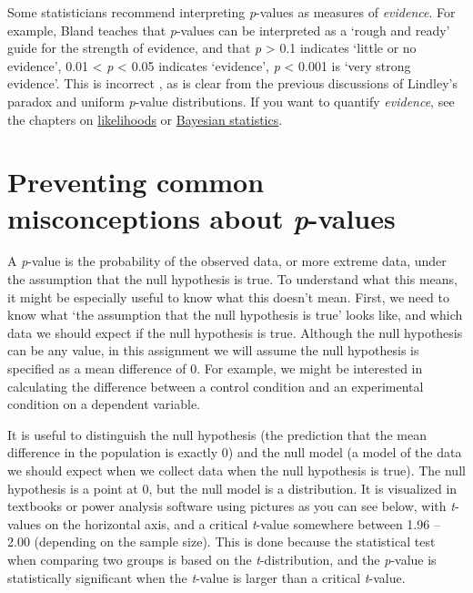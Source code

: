 \documentclass[
  oneside]{book}
\begin{document}
Some statisticians recommend interpreting \emph{p}-values as measures of \emph{evidence}. For example, Bland \citeyearpar{bland_introduction_2015} teaches that \emph{p}-values can be interpreted as a `rough and ready' guide for the strength of evidence, and that \emph{p} \textgreater{} 0.1 indicates `little or no evidence', 0.01 \textless{} \emph{p} \textless{} 0.05 indicates `evidence', \emph{p} \textless{} 0.001 is `very strong evidence'. This is incorrect \citep{lakens_why_2022}, as is clear from the previous discussions of Lindley's paradox and uniform \emph{p}-value distributions. If you want to quantify \emph{evidence}, see the chapters on \protect\hyperlink{likelihoods}{likelihoods} or \protect\hyperlink{bayes}{Bayesian statistics}.

\hypertarget{misconceptions}{%
\section{\texorpdfstring{Preventing common misconceptions about \emph{p}-values}{Preventing common misconceptions about p-values}}\label{misconceptions}}

A \emph{p}-value is the probability of the observed data, or more extreme data, under the assumption that the null hypothesis is true. To understand what this means, it might be especially useful to know what this doesn't mean. First, we need to know what `the assumption that the null hypothesis is true' looks like, and which data we should expect if the null hypothesis is true. Although the null hypothesis can be any value, in this assignment we will assume the null hypothesis is specified as a mean difference of 0. For example, we might be interested in calculating the difference between a control condition and an experimental condition on a dependent variable.

It is useful to distinguish the null hypothesis (the prediction that the mean difference in the population is exactly 0) and the null model (a model of the data we should expect when we collect data when the null hypothesis is true). The null hypothesis is a point at 0, but the null model is a distribution. It is visualized in textbooks or power analysis software using pictures as you can see below, with \emph{t}-values on the horizontal axis, and a critical \emph{t}-value somewhere between 1.96 -- 2.00 (depending on the sample size). This is done because the statistical test when comparing two groups is based on the \emph{t}-distribution, and the \emph{p}-value is statistically significant when the \emph{t}-value is larger than a critical \emph{t}-value.
\end{document}
